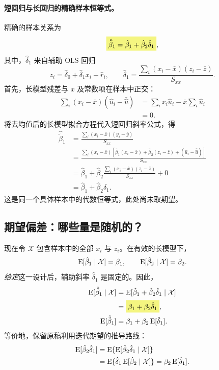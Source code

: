 \paragraph{短回归与长回归的精确样本恒等式。}
精确的样本关系为
\begin{equation}\label{eq:sample-ovb}
\hm{\hat{\tilde\beta}_1=\hat\beta_1+\hat\beta_2\hat\delta_1},
\end{equation}
其中，$\hat\delta_1$ 来自辅助 OLS 回归
\[z_i=\hat\delta_0+\hat\delta_1x_i+\hat r_i,
\qquad
\hat\delta_1=\frac{\sum_i(x_i-\bar x)(z_i-\bar z)}{S_{xx}}.
\]
首先，长模型残差与 $x$ 及常数项在样本中正交：
\begin{align*}
\sum_i(x_i-\bar x)(\hat u_i-\bar{\hat u})
&=\sum_i x_i\hat u_i-\bar x\sum_i\hat u_i\\
&=0.
\end{align*}
将去均值后的长模型拟合方程代入短回归斜率公式，得
\begin{align*}
\hat{\tilde\beta}_1
&=\frac{\sum_i(x_i-\bar x)(y_i-\bar y)}{S_{xx}}\\
&=\frac{\sum_i(x_i-\bar x)\left[\hat\beta_1(x_i-\bar x)
+\hat\beta_2(z_i-\bar z)+(\hat u_i-\bar{\hat u})\right]}{S_{xx}}\\
&=\hat\beta_1+\hat\beta_2\frac{\sum_i(x_i-\bar x)(z_i-\bar z)}{S_{xx}}+0\\
&=\hat\beta_1+\hat\beta_2\hat\delta_1.
\end{align*}
这是同一个具体样本中的代数恒等式，此处尚未取期望。

\subsection{期望偏差：哪些量是随机的？}
\label{sec:ovb-expectation}
现在令 $\mathcal X$ 包含样本中的全部 $x_i$ 与 $z_i$。在有效的长模型下，
\[\operatorname{E}[\hat\beta_1\mid\mathcal X]=\beta_1,
\qquad\operatorname{E}[\hat\beta_2\mid\mathcal X]=\beta_2.
\]
\emph{给定}这一设计后，辅助斜率 $\hat\delta_1$ 是固定的。因此，
\begin{align}
\E[\hat{\tilde\beta}_1\mid\mathcal X]
&=\E[\hat\beta_1+\hat\beta_2\hat\delta_1\mid\mathcal X]\notag\\
&=\hm{\beta_1+\beta_2\hat\delta_1},\label{eq:ovb-conditional}\\
\E[\hat{\tilde\beta}_1]
&=\beta_1+\beta_2\E[\hat\delta_1].\label{eq:ovb-unconditional}
\end{align}
等价地，保留原稿利用迭代期望的推导路线：
\begin{align*}
\operatorname{E}[\hat\beta_2\hat\delta_1]
&=\operatorname{E}\{\operatorname{E}[\hat\beta_2\hat\delta_1\mid\mathcal X]\}\\
&=\operatorname{E}\{\hat\delta_1\operatorname{E}[\hat\beta_2\mid\mathcal X]\}
=\beta_2\operatorname{E}[\hat\delta_1].
\end{align*}

